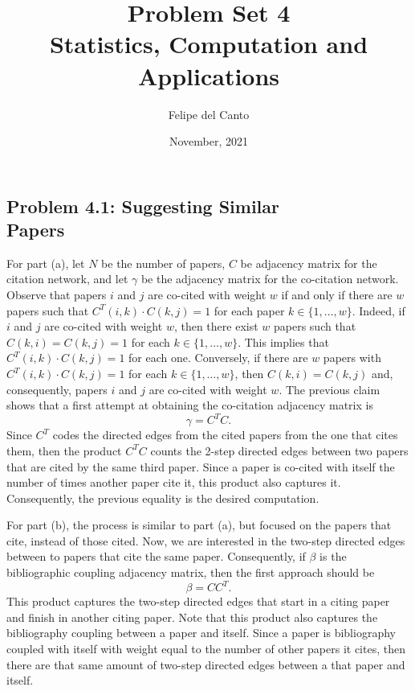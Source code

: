 \documentclass[11pt, english]{article}
\title{\bf Problem Set 4 \\ Statistics, Computation and
Applications\\[-1ex]}
\author{Felipe del Canto}
\date{November, 2021}
\begin{document}
    
\maketitle
   
\begin{multicols}{2}

\section*{Problem 4.1: Suggesting Similar\\ Papers}

For part (a), let $N$ be the number of papers, $C$ be adjacency matrix for the citation network, and let $\gamma$ be the adjacency matrix for the co-citation network. Observe that papers $i$ and $j$ are co-cited with weight $w$ if and only if there are $w$ papers such that $C^{T}(i,k) \cdot C(k,j) = 1$ for each paper $k \in \{1,\ldots,w\}$. Indeed, if $i$ and $j$ are co-cited with weight $w$, then there exist $w$ papers such that $C(k,i) = C(k,j) = 1$ for each $k \in \{1, \ldots, w\}$. This implies that $C^{T}(i,k) \cdot C(k,j) = 1$ for each one. Conversely, if there are $w$ papers with $C^{T}(i,k) \cdot C(k,j) = 1$ for each $k \in \{1, \ldots, w\}$, then $C(k,i) = C(k,j)$ and, consequently, papers $i$ and $j$ are co-cited with weight $w$. The previous claim shows that a first attempt at obtaining the co-citation adjacency matrix is
	$$\gamma = C^{T}C.$$
Since $C^{T}$ codes the directed edges from the cited papers from the one that cites them, then the product $C^{T}C$ counts the 2-step directed edges between two papers that are cited by the same third paper. Since a paper is co-cited with itself the number of times another paper cite it, this product also captures it. Consequently, the previous equality is the desired computation.

For part (b), the process is similar to part (a), but focused on the papers that cite, instead of those cited. Now, we are interested in the two-step directed edges between to papers that cite the same paper. Consequently, if $\beta$ is the bibliographic coupling adjacency matrix, then the first approach should be
	$$\beta = CC^{T}.$$
This product captures the two-step directed edges that start in a citing paper and finish in another citing paper. Note that this product also captures the bibliography coupling between a paper and itself. Since a paper is bibliography coupled with itself with weight equal to the number of other papers it cites, then there are that same amount of two-step directed edges between a that paper and itself.


\end{multicols}
\end{document}
